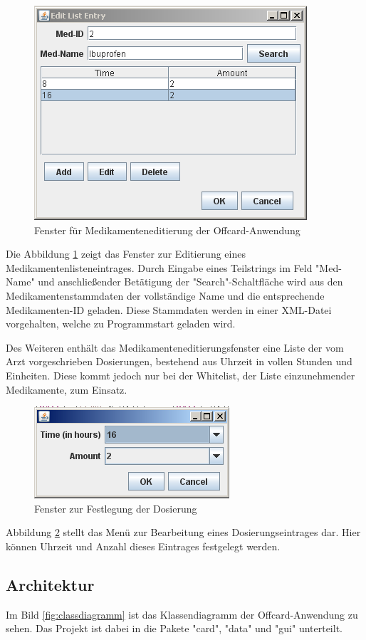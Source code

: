 \documentclass[parskip]{scrartcl}
\begin{document}
		\begin{figure}[H]
			\centering
			\includegraphics[width=.6\linewidth]{./mededitgui.png}
			\caption{Fenster für Medikamenteneditierung der Offcard-Anwendung}
			\label{fig:mededit}
		\end{figure}
		
		Die Abbildung \ref{fig:mededit} zeigt das Fenster zur Editierung eines Medikamentenlisteneintrages. Durch Eingabe eines Teilstrings im Feld "Med-Name" und anschließender Betätigung der "Search"-Schaltfläche wird aus den Medikamentenstammdaten der vollständige Name und die entsprechende Medikamenten-ID geladen. Diese Stammdaten werden in einer XML-Datei vorgehalten, welche zu Programmstart geladen wird.
		
		Des Weiteren enthält das Medikamenteneditierungsfenster eine Liste der vom Arzt vorgeschrieben Dosierungen, bestehend aus Uhrzeit in vollen Stunden und Einheiten. Diese kommt jedoch nur bei der Whitelist, der Liste einzunehmender Medikamente, zum Einsatz. 
		
		\begin{figure}[H]
			\centering
			\includegraphics[width=.4\linewidth]{./dosageeditgui.png}
			\caption{Fenster zur Festlegung der Dosierung}
			\label{fig:dosageedit}
		\end{figure}
		
		Abbildung \ref{fig:dosageedit} stellt das Menü zur Bearbeitung eines Dosierungseintrages dar. Hier können Uhrzeit und Anzahl dieses Eintrages festgelegt werden.
		
		\subsection{Architektur}
		Im Bild \ref{fig:classdiagramm} ist das Klassendiagramm der Offcard-Anwendung zu sehen. Das Projekt ist dabei in die Pakete "card", "data" und "gui" unterteilt.
		
\end{document}
